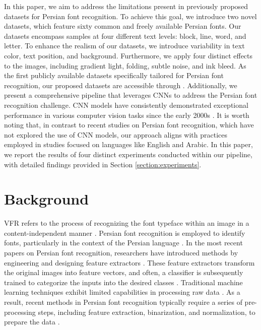 \documentclass[conference]{IEEEtran}
\begin{document}
In this paper, we aim to address the limitations present in previously proposed datasets for Persian font recognition. To achieve this goal, we introduce two novel datasets, which feature sixty common and freely available Persian fonts. Our datasets encompass samples at four different text levels: block, line, word, and letter. To enhance the realism of our datasets, we introduce variability in text color, text position, and background. Furthermore, we apply four distinct effects to the images, including gradient light, folding, subtle noise, and ink bleed.
As the first publicly available datasets specifically tailored for Persian font recognition, our proposed datasets are accessible through \cite{41}.
Additionally, we present a comprehensive pipeline that leverages CNNs to address the Persian font recognition challenge. CNN models have consistently demonstrated exceptional performance in various computer vision tasks since the early 2000s \cite{28}.
It is worth noting that, in contrast to recent studies on Persian font recognition, which have not explored the use of CNN models, our approach aligns with practices employed in studies focused on languages like English and Arabic. In this paper, we report the results of four distinct experiments conducted within our pipeline, with detailed findings provided in Section \ref{section:experiments}. \section{Background} 
VFR refers to the process of recognizing the font typeface within an image in a content-independent manner \cite{25}.
Persian font recognition is employed to identify fonts, particularly in the context of the Persian language \cite{7}.
In the most recent papers on Persian font recognition, researchers have introduced methods by engineering and designing feature extractors \cite{8}. These feature extractors transform the original images into feature vectors, and often, a classifier is subsequently trained to categorize the inputs into the desired classes \cite{28}.
Traditional machine learning techniques exhibit limited capabilities in processing raw data \cite{28}. As a result, recent methods in Persian font recognition typically require a series of pre-processing steps, including feature extraction, binarization, and normalization, to prepare the data \cite{1,2}.
\end{document}
